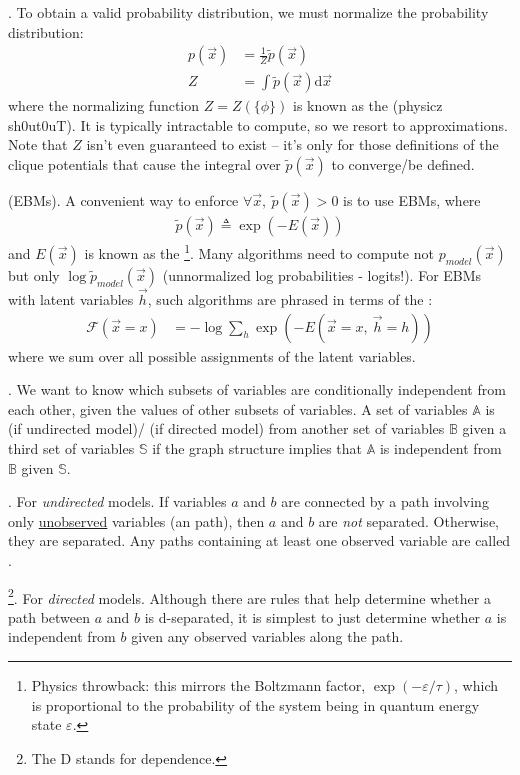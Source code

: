 \documentclass[11pt]{article}
\begin{document}
\myspace
\p {}. To obtain a valid probability distribution, we must normalize the probability distribution:
\begin{align}
	p(\vec{x}) &= \frac{1}{Z} \widetilde{p}(\vec{x}) \\
	Z &= \int \widetilde{p}(\vec{x}) \mathrm{d}\vec{x}
\end{align}
where the normalizing function $Z = Z(\{\phi\})$ is known as the  (physicz sh0ut0uT). It is typically intractable to compute, so we resort to approximations. Note that $Z$ isn't even guaranteed to exist -- it's only for those definitions of the clique potentials that cause the integral over $\widetilde{p}(\vec{x})$ to converge/be defined.

\myspace
\p {} (EBMs). A convenient way to enforce $\forall \vec{x}, ~ \widetilde{p}(\vec{x}) > 0$ is to use EBMs, where
\begin{align}
	\widetilde{p}(\vec{x}) \triangleq \exp\left( -E(\vec{x}) \right)
\end{align}
and $E(\vec{x})$ is known as the \footnote{Physics throwback: this mirrors the Boltzmann factor, $\exp(-\varepsilon/\tau)$, which is proportional to the probability of the system being in quantum energy state $\varepsilon$.}. Many algorithms need to compute not $p_{model}(\vec{x})$ but only $\log\widetilde{p}_{model}(\vec{x})$ (unnormalized log probabilities - logits!). For EBMs with latent variables $\vec{h}$, such algorithms are phrased in terms of the :
\begin{align}
	\mathcal{F}(\vec{x} = x) &= -\log \sum_{h} \exp\left( - E(\vec{x}=x, ~ \vec{h} = h ) \right)
\end{align}
where we sum over all possible assignments of the latent variables.


\myspace
\p {}. We want to know which subsets of variables are conditionally independent from each other, given the values of other subsets of variables.  A set of variables $\mathbb{A}$ is  (if undirected model)/ (if directed model) from another set of variables $\mathbb{B}$ given a third set of variables $\mathbb{S}$ if the graph structure implies that $\mathbb{A}$ is independent from $\mathbb{B}$ given $\mathbb{S}$. 

\begin{compactitem}
	\item {}. For \textit{undirected} models. If variables $a$ and $b$ are connected by a path involving only \underline{unobserved} variables (an  path), then $a$ and $b$ are \textit{not} separated. Otherwise, they are separated. Any paths containing at least one observed variable are called .

	\item {}\footnote{The D stands for dependence.}. For \textit{directed} models. Although there are rules that help determine whether a path between $a$ and $b$ is d-separated, it is simplest to just determine whether $a$ is independent from $b$ given any observed variables along the path.
\end{compactitem}
\end{document}

